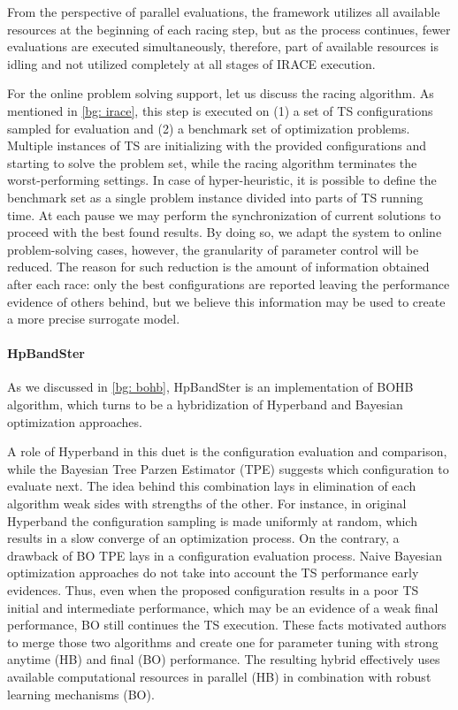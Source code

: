 From the perspective of parallel evaluations, the framework utilizes all available resources at the beginning of each racing step, but as the process continues, fewer evaluations are executed simultaneously, therefore, part of available resources is idling and not utilized completely at all stages of IRACE execution.

For the online problem solving support, let us discuss the racing algorithm. As mentioned in \cref{bg: irace}, this step is executed on (1) a set of TS configurations sampled for evaluation and (2) a benchmark set of optimization problems. Multiple instances of TS are initializing with the provided configurations and starting to solve the problem set, while the racing algorithm terminates the worst-performing settings. In case of hyper-heuristic, it is possible to define the benchmark set as a single problem instance divided into parts of TS running time. At each pause we may perform the synchronization of current solutions to proceed with the best found results. By doing so, we adapt the system to online problem-solving cases, however, the granularity of parameter control will be reduced. The reason for such reduction is the amount of information obtained after each race: only the best configurations are reported leaving the performance evidence of others behind, but we believe this information may be used to create a more precise surrogate model.

\paragraph{HpBandSter} As we discussed in \cref{bg: bohb}, HpBandSter is an implementation of BOHB algorithm, which turns to be a hybridization of Hyperband and Bayesian optimization approaches.

A role of Hyperband in this duet is the configuration evaluation and comparison, while the Bayesian Tree Parzen Estimator (TPE) suggests which configuration to evaluate next. The idea behind this combination lays in elimination of each algorithm weak sides with strengths of the other. For instance, in original Hyperband the configuration sampling is made uniformly at random, which results in a slow converge of an optimization process. On the contrary, a drawback of BO TPE lays in a configuration evaluation process. Naive Bayesian optimization approaches do not take into account the TS performance early evidences. Thus, even when the proposed configuration results in a poor TS initial and intermediate performance, which may be an evidence of a weak final performance, BO still continues the TS execution. These facts motivated authors to merge those two algorithms and create one for parameter tuning with strong anytime (HB) and final (BO) performance. The resulting hybrid effectively uses available computational resources in parallel (HB) in combination with robust learning mechanisms (BO).

